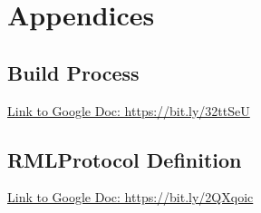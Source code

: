 \documentclass[letterpaper, 10 pt, conference]{ieeeconf}  %
\begin{document}



\newpage
\appendix
\section{Appendices}

\subsection{Build Process}


\href{https://docs.google.com/document/d/1_NFA3L7FgsLT_E70pb2BcXp33b8JFPGKjbd9sz8ftQI/edit?usp=sharing}{Link to Google Doc: https://bit.ly/32ttSeU}

\subsection{RMLProtocol Definition}

\href{https://docs.google.com/document/d/1cSnrM0hEOot5myDe9eK7aO5bT6LY-UzJp4RNLIoQbEQ/edit?usp=sharing}{Link to Google Doc: https://bit.ly/2QXqoic}




\newpage

\end{document}

